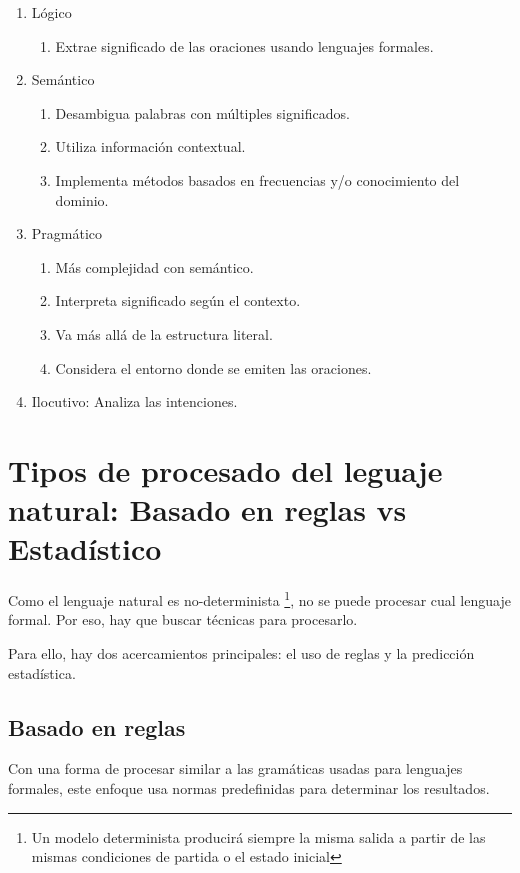\documentclass{report}
\begin{document}
\begin{enumerate}
    \item{Lógico}
    \begin{enumerate}
        \item Extrae significado de las oraciones usando lenguajes formales.
        
    \end{enumerate}
    
    \item {Semántico}
    \begin{enumerate}
        \item Desambigua palabras con múltiples significados.
        \item Utiliza información contextual.
        \item Implementa métodos basados en frecuencias y/o conocimiento del dominio.
    \end{enumerate}
    
    \item {Pragmático}
    \begin{enumerate}
        \item Más complejidad con semántico.
        \item Interpreta significado según el contexto.
        \item Va más allá de la estructura literal.
        \item Considera el entorno donde se emiten las oraciones.
    \end{enumerate}

    \item{Ilocutivo:} Analiza las intenciones.
    
\end{enumerate}

\section{Tipos de procesado del leguaje natural: Basado en reglas vs Estadístico}
Como el lenguaje natural es no-determinista \footnote{Un modelo determinista producirá siempre la misma salida a partir de las mismas condiciones de partida o el estado inicial}, no se puede procesar cual lenguaje formal. Por eso, hay que buscar técnicas para procesarlo.

Para ello, hay dos acercamientos principales: el uso de reglas y la predicción estadística.

\subsection{Basado en reglas}
Con una forma de procesar similar a las gramáticas usadas para lenguajes formales, este enfoque usa normas predefinidas para determinar los resultados.
\end{document}
